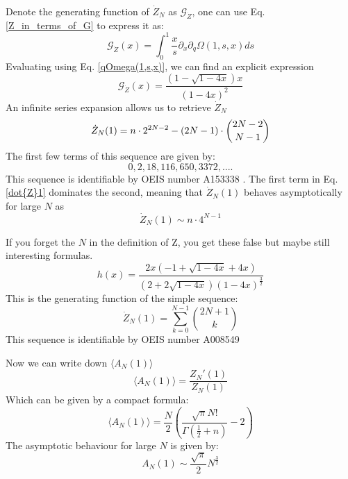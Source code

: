 \documentclass[pdflatex,sn-mathphys-num]{sn-jnl}
\theoremstyle{definition}
\theoremstyle{remark}
\numberwithin{equation}{section}
\begin{document}
\begin{appendices}
\begin{equation}
\end{equation}
Denote the generating function of $\dot{Z}_N$ as $\mathcal{G}_{\dot{Z}}$, one can use Eq. \ref{Z_in_terms_of_G} to express it as:
\begin{equation}
    \mathcal{G}_{\dot{Z}}(x) = \int_{0}^{1} \frac{x}{s} \partial_x \partial_q \Omega(1,s,x)
    ds
\end{equation}
Evaluating using Eq. \ref{qOmega(1,s,x)}, we can find an explicit expression
\begin{equation}
     \mathcal{G}_{\dot{Z}}(x) = \frac{(1 - \sqrt{1 - 4x})x}{(1 - 4x)^2}
\end{equation}
An infinite series expansion allows us to retrieve $\dot{Z}_N$
\begin{equation}
    \dot{Z}_N(1) = n \cdot 2^{2N-2} - (2N-1) \cdot \binom{2N-2}{N-1}
    \label{dot{Z}1}
\end{equation}
The first few terms of this sequence are given by:
$$0, 2, 18, 116, 650, 3372, ....$$
This sequence is identifiable by  OEIS number A153338 \cite{OEIS-A015333}.
The first term in Eq. \ref{dot{Z}1} dominates the second, meaning that $\dot{Z}_N(1)$ behaves asymptotically for large $N$ as
\begin{equation}
    \dot{Z}_N(1) \sim n \cdot 4^{N-1}
\end{equation}

\iffalse
If you forget the $N$ in the definition of Z, you get these false but maybe still interesting formulas.
\begin{equation}
    h(x) = \frac{2x(-1 + \sqrt{1 - 4x} + 4x)}{(2 + 2\sqrt{1 - 4x})(1 - 4x)^{\frac{3}{2}}}
\end{equation}
This is the generating function of the simple sequence:
\begin{equation}
\dot{Z}_N(1) =
     \sum_{k=0}^{N-1} \binom{2N+1}{k}
\end{equation}
This sequence is identifiable by  OEIS number A008549


Now we can write down $\langle A_N(1) \rangle$
\begin{equation}
    \langle A_N(1) \rangle = \frac{Z_N'(1)}{Z_N(1)}
\end{equation}
Which can be given by a compact formula:
\begin{equation}
\langle A_N(1) \rangle =
    \frac{N}{2} \left(\frac{\sqrt{\pi} N! }{\Gamma\left(\frac{1}{2} + n\right)} - 2\right)
\end{equation}
The asymptotic behaviour for large $N$ is given by:
\begin{equation}
A_N(1) \sim \frac{\sqrt{\pi}}{2}N^{\frac{3}{2}}
\end{equation}



\end{appendices}
\end{document}
